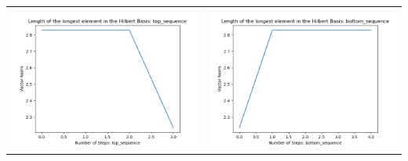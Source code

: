 \documentclass[10pt]{article}
\begin{document}
\begin{tabular}{c|c}
\begin{minipage}{.45\textwidth}
\includegraphics[width=\textwidth]{"DATA/5d/5 generators 1 bound D/top_sequence LENGTH"}
\end{minipage} &
\begin{minipage}{.45\textwidth}
\includegraphics[width=\textwidth]{"DATA/5d/5 generators 1 bound D bottomup/bottom_sequence LENGTH"}
\end{minipage}
\end{tabular}
\end{document}
